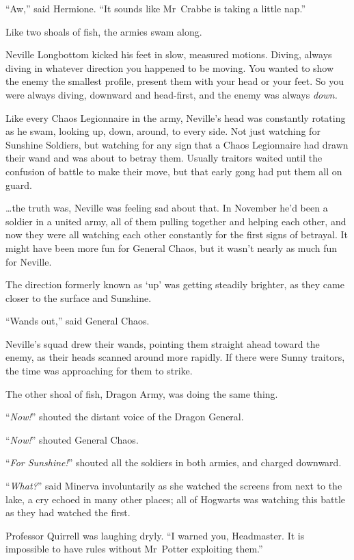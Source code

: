 “Aw,” said Hermione. “It sounds like Mr~Crabbe is taking a little nap.”

\later

Like two shoals of fish, the armies swam along.

Neville Longbottom kicked his feet in slow, measured motions. Diving, always diving in whatever direction you happened to be moving. You wanted to show the enemy the smallest profile, present them with your head or your feet. So you were always diving, downward and head-first, and the enemy was always \emph{down.}

Like every Chaos Legionnaire in the army, Neville’s head was constantly rotating as he swam, looking up, down, around, to every side. Not just watching for Sunshine Soldiers, but watching for any sign that a Chaos Legionnaire had drawn their wand and was about to betray them. Usually traitors waited until the confusion of battle to make their move, but that early gong had put them all on guard.

…the truth was, Neville was feeling sad about that. In November he’d been a soldier in a united army, all of them pulling together and helping each other, and now they were all watching each other constantly for the first signs of betrayal. It might have been more fun for General Chaos, but it wasn’t nearly as much fun for Neville.

The direction formerly known as ‘up’ was getting steadily brighter, as they came closer to the surface and Sunshine.

“Wands out,” said General Chaos.

Neville’s squad drew their wands, pointing them straight ahead toward the enemy, as their heads scanned around more rapidly. If there were Sunny traitors, the time was approaching for them to strike.

The other shoal of fish, Dragon Army, was doing the same thing.

“\emph{Now!}” shouted the distant voice of the Dragon General.

“\emph{Now!}” shouted General Chaos.

“\emph{For Sunshine!}” shouted all the soldiers in both armies, and charged downward.

\later

“\emph{What?}” said Minerva involuntarily as she watched the screens from next to the lake, a cry echoed in many other places; all of Hogwarts was watching this battle as they had watched the first.

Professor Quirrell was laughing dryly. “I warned you, Headmaster. It is impossible to have rules without Mr~Potter exploiting them.”

